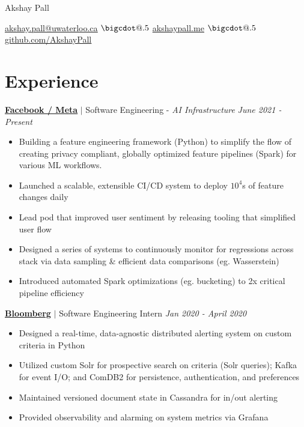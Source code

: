 \documentclass[paper=a4,fontsize=15pt]{scrartcl}
\makeatletter
\newcommand*\bigcdot{\mathpalette\bigcdot@{.5}}
\newcommand*\bigcdot@[2]{\mathbin{\vcenter{\hbox{\scalebox{#2}{$\m@th#1\bullet$}}}}}
\newcommand{\smolboispace}{\vspace*{0.1em}}
\newcommand{\bighalfspace}{\vspace*{0.75em}}
\newcommand{\http}[1]{\href{http://#1}{\ul{#1}}}
\newcommand{\https}[1]{\href{https://#1}{\ul{#1}}}
\newcommand{\email}[1]{\href{mailto:#1}{\ul{#1}}}
\makeatother
\begin{document}
\begin{center}
  {\fontsize{35}{40}\selectfont Akshay Pall \par}

  \smolboispace
  \smolboispace

  {\normalsize
    \email{akshay.pall@uwaterloo.ca}
    $\bigcdot$ \http{akshaypall.me}
    $\bigcdot$ \https{github.com/AkshayPall}
    \par}
\end{center}

 \section*{Experience}{}
\normalsize
\noindent \href{https://facebook.com}{\textbf{\ul{Facebook / Meta}}}
$\vert$ \small Software Engineering - \textit{AI Infrastructure}
{\hfill \footnotesize \textit{June 2021 - Present}}
\begin{itemize}[noitemsep,leftmargin=20pt,label=\raisebox{0.25ex}{\tiny$\bullet$},topsep=5pt]
    \small
    
    \item Building a feature engineering framework (Python) to simplify the flow of creating privacy compliant, globally optimized feature pipelines (Spark) for various ML workflows. 
    \item Launched a scalable, extensible  CI/CD system to deploy $10^{4}$s of feature changes daily
    \item Lead pod that improved user sentiment by releasing tooling that simplified user flow
    \item Designed a series of systems to continuously monitor for regressions across stack via data sampling \& efficient data comparisons (eg. Wasserstein)
    \item Introduced automated Spark optimizations (eg. bucketing) to 2x critical pipeline efficiency 
    
\end{itemize}

\bighalfspace
\normalsize
\noindent \href{https://bloomberg.com}{\textbf{\ul{Bloomberg}}}
$\vert$ \small Software Engineering Intern
{\hfill \footnotesize \textit{Jan 2020 - April 2020}}
\begin{itemize}[noitemsep,leftmargin=20pt,label=\raisebox{0.25ex}{\tiny$\bullet$},topsep=5pt]
  \small
 
  \item Designed a real-time, data-agnostic distributed alerting system on custom criteria in Python
    
  \item Utilized custom Solr for prospective search on criteria (Solr queries); Kafka for event I/O; and ComDB2 for persistence, authentication, and preferences

  \item Maintained versioned document state in Cassandra for in/out alerting
  
  \item Provided observability and alarming on system metrics via Grafana
  
\end{itemize}
\end{document}
